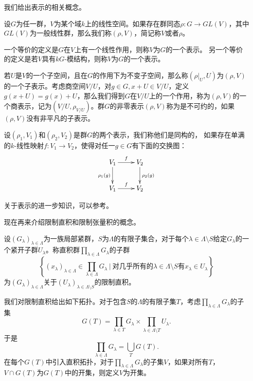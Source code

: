   我们给出表示的相关概念。

  \begin{definition}
  设$G$为任一群，$V$为某个域$k$上的线性空间。如果存在群同态$\rho:
  G\rightarrow  GL(V)$，其中$GL(V)$为一般线性群，那么我们称$(\rho,
  V)$，简记称$V$或者$\rho$。
  \end{definition}
  一个等价的定义是$G$在$V$上有一个线性作用，则称$V$为$G$的一个表示。
  另一个等价的定义是若$V$具有$kG$-模结构，则称$V$为$G$的一个表示。

  若$U$是$V$的一个子空间，且在$G$的作用下为不变子空间，那么称$(\rho|_U, U)$为$(\rho,
  V)$的一个子表示。考虑商空间$V/U$，对$g\in G, x+U\in
  V/U$，定义$g(x+U) = g(x)+U$，那么我们得到$G$在$V/U$上的一个作用，称为$(\rho,
  V)$的一个商表示，记为$(V/U, \rho_{V/U})$。群$G$的非零表示$(\rho,
  V)$称为是不可约的，如果$(\rho, V)$没有非平凡的子表示。

  设$(\rho_1, V_1)$和$(\rho_2, V_2)$是群$G$的两个表示，我们称他们是同构的，
  如果存在单满的$k$-线性映射$f:V_1\rightarrow V_2$，使得对任一$g\in G$有下面的交换图：
  \[ \xymatrix{
  V_1 \ar[r]^f \ar[d]_{\rho_1 (g)} & V_2 \ar[d]^{\rho_2 (g)}  \\
  V_1 \ar[r]^f & V_2 }  \]

  关于表示的进一步知识，可以参考。

  现在再来介绍限制直积和限制张量积的概念。

  \begin{definition}
  设$(G_{\lambda})_{\lambda\in
  \Lambda}$为一族局部紧群，$S$为$\Lambda$的有限子集合，对于每个$\lambda\in \Lambda\setminus
  S$给定$G_{\lambda}$的一个紧开子群$U_{\lambda}$。称直积群$\prod\limits_{\lambda\in \Lambda}
  G_{\lambda}$的子群
  $$\left\{(x_{\lambda})_{\lambda\in \Lambda}\in \prod\limits_{\lambda\in \Lambda} G_{\lambda}\
  |\ \text{对几乎所有的} \lambda\in \Lambda\setminus S \text{有} x_{\lambda}\in
  U_{\lambda} \right\}$$
  为$(G_{\lambda})_{\lambda\in \Lambda}$关于$(U_{\lambda})_{\lambda\in \Lambda\setminus
  S}$的限制直积。
  \end{definition}

  我们对限制直积给出如下拓扑。对于包含$S$的$\Lambda$的有限子集$T$，考虑$\prod\limits_{\lambda\in
  \Lambda} G_{\lambda}$的子集
  $$G(T) = \prod\limits_{\lambda\in T} G_{\lambda} \times \prod\limits_{\lambda\in \Lambda\setminus
  T} U_{\lambda}.$$
  于是$$\prod\limits_{\lambda\in \Lambda} G_{\lambda} =
  \bigcup\limits_{T}G(T).$$
  在每个$G(T)$中引入直积拓扑，对于$\prod\limits_{\lambda\in \Lambda}
  G_{\lambda}$的子集$V$，如果对所有$T$，$V\cap
  G(T)$为$G(T)$中的开集，则定义$V$为开集。

